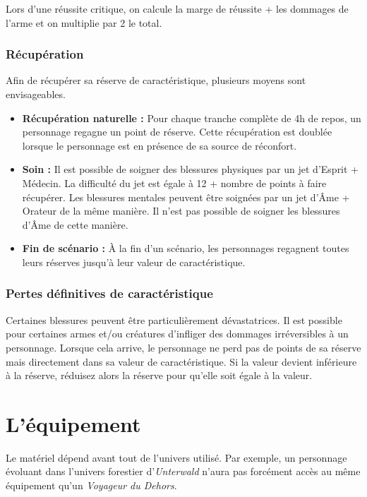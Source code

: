 \documentclass[a4paper,10pt,twoside,twocolumn,openany,bg=print]{dndbook}
\begin{document}
Lors d'une réussite critique, on calcule la marge de réussite + les dommages de l'arme et on multiplie par 2 le total.

\subsection*{Récupération}

Afin de récupérer sa réserve de caractéristique, plusieurs moyens sont envisageables.

\begin{itemize}
\item \textbf{Récupération naturelle :} Pour chaque tranche complète de 4h de repos, un personnage regagne un point de réserve. Cette récupération est doublée lorsque le personnage est en présence de sa source de réconfort.
\item \textbf{Soin :} Il est possible de soigner des blessures physiques par un jet d'Esprit + Médecin. La difficulté du jet est égale à 12 + nombre de points à faire récupérer. Les blessures mentales peuvent être soignées par un jet d'Âme + Orateur de la même manière. Il n'est pas possible de soigner les blessures d'Âme de cette manière.
\item \textbf{Fin de scénario :} À la fin d'un scénario, les personnages regagnent toutes leurs réserves jusqu'à leur valeur de caractéristique.
\end{itemize}

\subsection*{Pertes définitives de caractéristique}

Certaines blessures peuvent être particulièrement dévastatrices. Il est possible pour certaines armes et/ou créatures d'infliger des dommages irréversibles à un personnage. Lorsque cela arrive, le personnage ne perd pas de points de sa réserve mais directement dans sa valeur de caractéristique. Si la valeur devient inférieure à la réserve, réduisez alors la réserve pour qu'elle soit égale à la valeur.

\newpage

\chapter{L'équipement}

Le matériel dépend avant tout de l'univers utilisé. Par exemple, un personnage évoluant dans l'univers forestier d'\emph{Unterwald} n'aura pas forcément accès au même équipement qu'un \emph{Voyageur du Dehors}.
\end{document}
